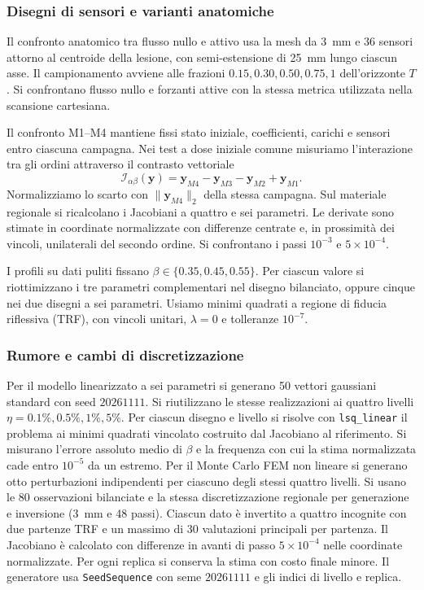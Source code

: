 \subsubsection{Disegni di sensori e varianti anatomiche}
\label{sec:anatomical-identifiability-method}
Il confronto anatomico tra flusso nullo e attivo usa la mesh da 3~mm e 36 sensori attorno al centroide della lesione, con semi-estensione di 25~mm lungo ciascun asse. Il campionamento avviene alle frazioni $0.15,0.30,0.50,0.75,1$ dell'orizzonte $T$. Si confrontano flusso nullo e forzanti attive con la stessa metrica utilizzata nella scansione cartesiana.

Il confronto M1--M4 mantiene fissi stato iniziale, coefficienti, carichi e sensori entro ciascuna campagna. Nei test a dose iniziale comune misuriamo l'interazione tra gli ordini attraverso il contrasto vettoriale
\begin{equation}
 \mathcal I_{\alpha\beta}(\mathbf y)
 =\mathbf y_{M4}-\mathbf y_{M3}-\mathbf y_{M2}+\mathbf y_{M1}.
 \label{eq:memory-factorial-interaction}
\end{equation}
Normalizziamo lo scarto con $\|\mathbf y_{M4}\|_2$ della stessa campagna. Sul materiale regionale si ricalcolano i Jacobiani a quattro e sei parametri. Le derivate sono stimate in coordinate normalizzate con differenze centrate e, in prossimità dei vincoli, unilaterali del secondo ordine. Si confrontano i passi $10^{-3}$ e $5\times10^{-4}$.

I profili su dati puliti fissano $\beta\in\{0.35,0.45,0.55\}$. Per ciascun valore si riottimizzano i tre parametri complementari nel disegno bilanciato, oppure cinque nei due disegni a sei parametri. Usiamo minimi quadrati a regione di fiducia riflessiva (TRF), con vincoli unitari, $\lambda=0$ e tolleranze $10^{-7}$.

\subsubsection{Rumore e cambi di discretizzazione}
Per il modello linearizzato a sei parametri si generano 50 vettori gaussiani standard con seed $20261111$. Si riutilizzano le stesse realizzazioni ai quattro livelli $\eta=0.1\%,0.5\%,1\%,5\%$. Per ciascun disegno e livello si risolve con \texttt{lsq\_linear} il problema ai minimi quadrati vincolato costruito dal Jacobiano al riferimento. Si misurano l'errore assoluto medio di $\beta$ e la frequenza con cui la stima normalizzata cade entro $10^{-5}$ da un estremo. Per il Monte Carlo FEM non lineare si generano otto perturbazioni indipendenti per ciascuno degli stessi quattro livelli. Si usano le 80 osservazioni bilanciate e la stessa discretizzazione regionale per generazione e inversione (3~mm e 48 passi). Ciascun dato è invertito a quattro incognite con due partenze TRF e un massimo di 30 valutazioni principali per partenza. Il Jacobiano è calcolato con differenze in avanti di passo $5\times10^{-4}$ nelle coordinate normalizzate. Per ogni replica si conserva la stima con costo finale minore. Il generatore usa \texttt{SeedSequence} con seme $20261111$ e gli indici di livello e replica.


